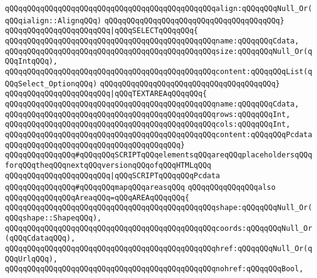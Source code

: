 \verb|qQQqqQQqqQQqqQQqqQQqqQQqqQQqqQQqqQQqqQQqqQQqqQQqalign:qQQqqQQqNull_Or(qQQqialign::AlignqQQq)|\newline
\verb|qQQqqQQqqQQqqQQqqQQqqQQqqQQqqQQqqQQqqQQq}|\newline
\verb|qQQqqQQqqQQqqQQqqQQqqQQq|\verb#|qQQqSELECTqQQqqQQq{#\newline
\verb|qQQqqQQqqQQqqQQqqQQqqQQqqQQqqQQqqQQqqQQqqQQqqQQqname:qQQqqQQqCdata,|\newline
\verb|qQQqqQQqqQQqqQQqqQQqqQQqqQQqqQQqqQQqqQQqqQQqqQQqsize:qQQqqQQqNull_Or(qQQqIntqQQq),|\newline
\verb|qQQqqQQqqQQqqQQqqQQqqQQqqQQqqQQqqQQqqQQqqQQqqQQqcontent:qQQqqQQqList(qQQqSelect_OptionqQQq)|\newline
\verb|qQQqqQQqqQQqqQQqqQQqqQQqqQQqqQQqqQQqqQQq}|\newline
\verb|qQQqqQQqqQQqqQQqqQQqqQQq|\verb#|qQQqTEXTAREAqQQqqQQq{#\newline
\verb|qQQqqQQqqQQqqQQqqQQqqQQqqQQqqQQqqQQqqQQqqQQqqQQqname:qQQqqQQqCdata,|\newline
\verb|qQQqqQQqqQQqqQQqqQQqqQQqqQQqqQQqqQQqqQQqqQQqqQQqrows:qQQqqQQqInt,|\newline
\verb|qQQqqQQqqQQqqQQqqQQqqQQqqQQqqQQqqQQqqQQqqQQqqQQqcols:qQQqqQQqInt,|\newline
\verb|qQQqqQQqqQQqqQQqqQQqqQQqqQQqqQQqqQQqqQQqqQQqqQQqcontent:qQQqqQQqPcdata|\newline
\verb|qQQqqQQqqQQqqQQqqQQqqQQqqQQqqQQqqQQqqQQq}|\newline
\verb|qQQqqQQqqQQqqQQq#qQQqqQQqSCRIPTqQQqelementsqQQqareqQQqplaceholdersqQQqforqQQqtheqQQqnextqQQqversionqQQqofqQQqHTMLqQQq|\newline
\verb|qQQqqQQqqQQqqQQqqQQqqQQq|\verb#|qQQqSCRIPTqQQqqQQqPcdata#\newline
\newline
\verb|qQQqqQQqqQQqqQQq#qQQqqQQqmapqQQqareasqQQq|\newline
\verb|qQQqqQQqqQQqqQQqalso|\newline
\verb|qQQqqQQqqQQqqQQqAreaqQQq=qQQqAREAqQQqqQQq{|\newline
\verb|qQQqqQQqqQQqqQQqqQQqqQQqqQQqqQQqqQQqqQQqqQQqqQQqshape:qQQqqQQqNull_Or(qQQqshape::ShapeqQQq),|\newline
\verb|qQQqqQQqqQQqqQQqqQQqqQQqqQQqqQQqqQQqqQQqqQQqqQQqcoords:qQQqqQQqNull_Or(qQQqCdataqQQq),|\newline
\verb|qQQqqQQqqQQqqQQqqQQqqQQqqQQqqQQqqQQqqQQqqQQqqQQqhref:qQQqqQQqNull_Or(qQQqUrlqQQq),|\newline
\verb|qQQqqQQqqQQqqQQqqQQqqQQqqQQqqQQqqQQqqQQqqQQqqQQqnohref:qQQqqQQqBool,|\newline
